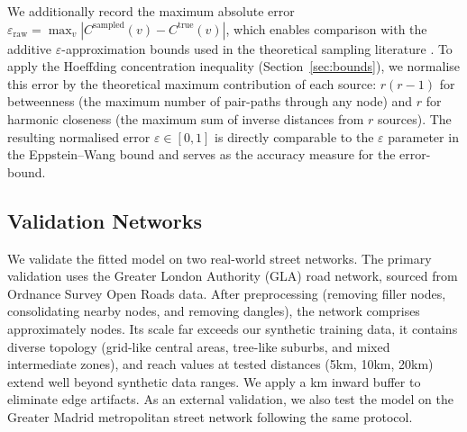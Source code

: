 We additionally record the maximum absolute error $\varepsilon_{\text{raw}} = \max_v |C^{\text{sampled}}(v) - C^{\text{true}}(v)|$, which enables comparison with the additive $\varepsilon$-approximation bounds used in the theoretical sampling literature \citep{Riondato2016, Bader2007}. To apply the Hoeffding concentration inequality \citep{Hoeffding1963} (Section~\ref{sec:bounds}), we normalise this error by the theoretical maximum contribution of each source: $r(r-1)$ for betweenness (the maximum number of pair-paths through any node) and $r$ for harmonic closeness (the maximum sum of inverse distances from $r$ sources). The resulting normalised error $\varepsilon \in [0, 1]$ is directly comparable to the $\varepsilon$ parameter in the Eppstein--Wang bound and serves as the accuracy measure for the error-bound.

\subsection{Validation Networks}

We validate the fitted model on two real-world street networks. The primary validation uses the Greater London Authority (GLA) road network, sourced from Ordnance Survey Open Roads data. After preprocessing (removing filler nodes, consolidating nearby nodes, and removing dangles), the network comprises approximately \glaNnodes{} nodes. Its scale far exceeds our synthetic training data, it contains diverse topology (grid-like central areas, tree-like suburbs, and mixed intermediate zones), and reach values at tested distances (5km, 10km, 20km) extend well beyond synthetic data ranges. We apply a \glaBuffer{}km inward buffer to eliminate edge artifacts. As an external validation, we also test the model on the Greater Madrid metropolitan street network following the same protocol.
